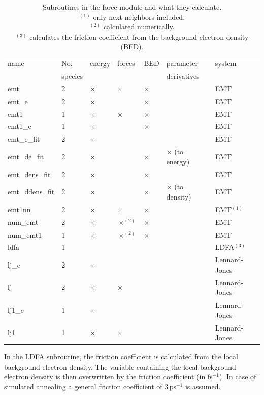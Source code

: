 \documentclass[twoside, 11pt, titlepage, captions=nooneline, a4paper, headsepline]{scrbook}%
\newcommand{\9}{\mathrm}
\newcommand{\0}{\,\mathrm}
\begin{document}
\begin{table}[b!]
\centering
\caption{Subroutines in the force-module and what they calculate.\\
$^{(1)}$ only next neighbors included.\\
$^{(2)}$ calculated numerically.\\
$^{(3)}$ calculates the friction coefficient from the background electron density (BED).}
\label{Tab:Funct:force}
\begin{tabular}{lllllll}
\hline\hline
name			&No.	& energy	&forces			&BED		&parameter	& system\\
&species&&&&derivatives&\\
\hline
emt				&2				&$\times$	&$\times$		&$\times$	&						&EMT\\
emt\_e 			&2 				&$\times$	&				&$\times$	&						&EMT\\
emt1			&1				&$\times$	&$\times$		&$\times$	&						&EMT\\
emt1\_e 		&1				&$\times$	&				&$\times$	&						&EMT\\
emt\_e\_fit 	&2 				&$\times$	&				&			&						&EMT\\
emt\_de\_fit 	&2				&$\times$	&				&$\times$	&$\times$ (to energy)	&EMT\\
emt\_dens\_fit	&2				&$\times$	&				&$\times$	&						&EMT\\
emt\_ddens\_fit	&2				&$\times$	&				&$\times$	&$\times$ (to density)	&EMT\\
emt1nn			&2				&$\times$	&$\times$		&$\times$	&						&EMT$^{(1)}$\\
num\_emt		&2				&$\times$	&$\times^{(2)}$	&$\times$	&						&EMT\\
num\_emt1		&1				&$\times$	&$\times^{(2)}$	&$\times$	&						&EMT\\
ldfa			&1				&			&				&			&						&LDFA$^{(3)}$\\
lj\_e			&2				&$\times$	&				&			&						&Lennard-Jones\\
lj				&2				&$\times$	&$\times$		&			&						&Lennard-Jones\\
lj1\_e			&1				&$\times$	&				&			&						&Lennard-Jones\\
lj1				&1				&$\times$	&$\times$		&			&						&Lennard-Jones\\

\hline
\hline
\end{tabular}
\end{table}

In the LDFA subroutine, the friction coefficient is calculated from the local background electron density. The variable containing the local background electron density is then overwritten by the friction coefficient (in fs$^{-1}$). In case of simulated annealing a general friction coefficient of 3\,ps$^{-1}$ is assumed.
\end{document}
